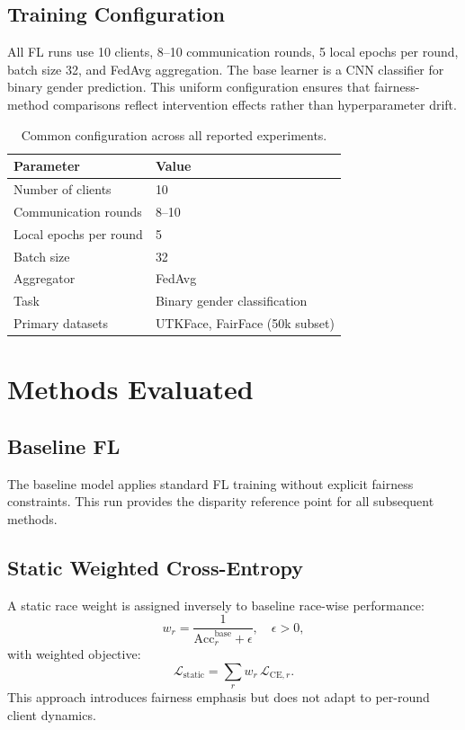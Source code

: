 \documentclass[11pt,a4paper]{article}
\begin{document}
\subsection{Training Configuration}
All FL runs use 10 clients, 8--10 communication rounds, 5 local epochs per round, batch size 32, and FedAvg aggregation. The base learner is a CNN classifier for binary gender prediction. This uniform configuration ensures that fairness-method comparisons reflect intervention effects rather than hyperparameter drift.

\begin{table}[H]
\centering
\small
\begin{tabular}{ll}
\toprule
\textbf{Parameter} & \textbf{Value} \\
\midrule
Number of clients & 10 \\
Communication rounds & 8--10 \\
Local epochs per round & 5 \\
Batch size & 32 \\
Aggregator & FedAvg \\
Task & Binary gender classification \\
Primary datasets & UTKFace, FairFace (50k subset) \\
\bottomrule
\end{tabular}
\caption{Common configuration across all reported experiments.}
\end{table}

\section{Methods Evaluated}
\subsection{Baseline FL}
The baseline model applies standard FL training without explicit fairness constraints. This run provides the disparity reference point for all subsequent methods.

\subsection{Static Weighted Cross-Entropy}
A static race weight is assigned inversely to baseline race-wise performance:
\begin{equation}
w_r = \frac{1}{\mathrm{Acc}^{\mathrm{base}}_r + \epsilon}, \quad \epsilon>0,
\end{equation}
with weighted objective:
\begin{equation}
\mathcal{L}_{\mathrm{static}} = \sum_r w_r\,\mathcal{L}_{\mathrm{CE},r}.
\end{equation}
This approach introduces fairness emphasis but does not adapt to per-round client dynamics.
\end{document}
